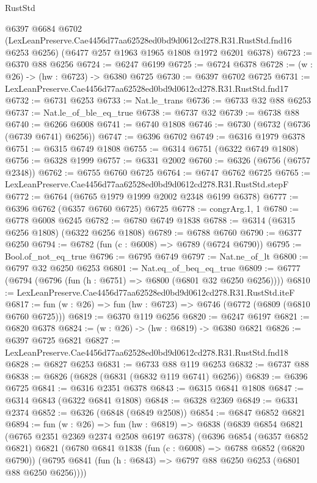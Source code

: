\begin{lexlean}{RustStd}
\begin{coremodule}
  @6397
    @6684
    @6702
    (LexLeanPreserve.Cae4456d77aa62528ed0bd9d0612cd278.R31.RustStd.fnd16 @6253 @6256)
    (@6477 @257 @1963 @1965 @1808 @1972 @6201 @6378)
@6723 := @6370 @88 @6256
@6724 := @6247 @6199
@6725 := @6724 @6378
@6728 := (w : @26) -> (hw : @6723) -> @6380 @6725
@6730 := @6397 @6702 @6725
@6731 := LexLeanPreserve.Cae4456d77aa62528ed0bd9d0612cd278.R31.RustStd.fnd17
@6732 := @6731 @6253
@6733 := Nat.le_trans
@6736 := @6733 @32 @88 @6253
@6737 := Nat.le_of_ble_eq_true
@6738 := @6737 @32
@6739 := @6738 @88
@6740 := @6266 @6008
@6741 := @6740 @1808
@6746 := @6730 (@6732 (@6736 (@6739 @6741) @6256))
@6747 := @6396 @6702
@6749 := @6316 @1979 @6378
@6751 := @6315 @6749 @1808
@6755 := @6314 @6751 (@6322 @6749 @1808)
@6756 := @6328 @1999
@6757 := @6331 @2002
@6760 := @6326 (@6756 (@6757 @2348))
@6762 := @6755 @6760 @6725
@6764 := @6747 @6762 @6725
@6765 := LexLeanPreserve.Cae4456d77aa62528ed0bd9d0612cd278.R31.RustStd.stepF
@6772 := @6764 (@6765 @1979 @1999 @2002 @2348 @6199 @6378)
@6777 := @6396 @6762 (@6357 @6760 @6725) @6725
@6778 := congrArg.{1, 1}
@6780 := @6778 @6008 @6245
@6782 := @6780 @6749 @1838
@6788 := @6314 (@6315 @6256 @1808) (@6322 @6256 @1808)
@6789 := @6788 @6760
@6790 := @6377 @6250
@6794 := @6782 (fun (c : @6008) => @6789 (@6724 @6790))
@6795 := Bool.of_not_eq_true
@6796 := @6795 @6749
@6797 := Nat.ne_of_lt
@6800 := @6797 @32 @6250 @6253
@6801 := Nat.eq_of_beq_eq_true
@6809 := @6777 (@6794 (@6796 (fun (h : @6751) => @6800 (@6801 @32 @6250 @6256))))
@6810 := LexLeanPreserve.Cae4456d77aa62528ed0bd9d0612cd278.R31.RustStd.iteF
@6817 := fun (w : @26) => fun (hw : @6723) => @6746 (@6772 (@6809 (@6810 @6760 @6725)))
@6819 := @6370 @119 @6256
@6820 := @6247 @6197
@6821 := @6820 @6378
@6824 := (w : @26) -> (hw : @6819) -> @6380 @6821
@6826 := @6397 @6725 @6821
@6827 := LexLeanPreserve.Cae4456d77aa62528ed0bd9d0612cd278.R31.RustStd.fnd18
@6828 := @6827 @6253
@6831 := @6733 @88 @119 @6253
@6832 := @6737 @88
@6838 := @6826 (@6828 (@6831 (@6832 @119 @6741) @6256))
@6839 := @6396 @6725
@6841 := @6316 @2351 @6378
@6843 := @6315 @6841 @1808
@6847 := @6314 @6843 (@6322 @6841 @1808)
@6848 := @6328 @2369
@6849 := @6331 @2374
@6852 := @6326 (@6848 (@6849 @2508))
@6854 := @6847 @6852 @6821
@6894 := fun (w : @26) =>
  fun (hw : @6819) =>
  @6838
    (@6839
      @6854
      @6821
      (@6765 @2351 @2369 @2374 @2508 @6197 @6378)
      (@6396
        @6854
        (@6357 @6852 @6821)
        @6821
        (@6780
          @6841
          @1838
          (fun (c : @6008) => @6788 @6852 (@6820 @6790))
          (@6795 @6841 (fun (h : @6843) => @6797 @88 @6250 @6253 (@6801 @88 @6250 @6256))))

\end{coremodule}
\end{lexlean}
